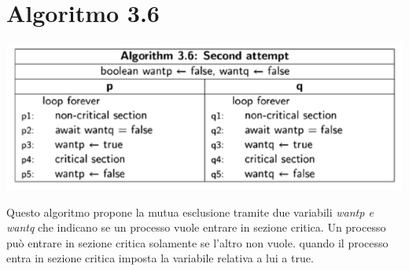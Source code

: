 \documentclass[a4paper]{article}
\begin{document}
\newpage
\section{Algoritmo 3.6}
\label{SEC:3.6}
\begin{center}\includegraphics[width=1\textwidth]{3.6.png}\end{center}
Questo algoritmo propone la mutua esclusione tramite due variabili \textit{wantp \textit{e} wantq} che indicano se un processo vuole entrare in sezione critica. Un processo può entrare in sezione critica solamente se l'altro non vuole. quando il processo entra in sezione critica imposta la variabile relativa a lui a true. 
\end{document}
